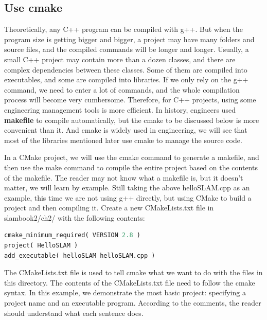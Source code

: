 \subsection{Use cmake}
Theoretically, any C++ program can be compiled with g++. But when the program size is getting bigger and bigger, a project may have many folders and source files, and the compiled commands will be longer and longer. Usually, a small C++ project may contain more than a dozen classes, and there are complex dependencies between these classes. Some of them are compiled into executables, and some are compiled into libraries. If we only rely on the g++ command, we need to enter a lot of commands, and the whole compilation process will become very cumbersome. Therefore, for C++ projects, using some engineering management tools is more efficient. In history, engineers used \textbf{makefile} to compile automatically, but the cmake to be discussed below is more convenient than it. And cmake is widely used in engineering, we will see that most of the libraries mentioned later use cmake to manage the source code.

In a CMake project, we will use the cmake command to generate a makefile, and then use the make command to compile the entire project based on the contents of the makefile. The reader may not know what a makefile is, but it doesn't matter, we will learn by example. Still taking the above helloSLAM.cpp as an example, this time we are not using g++ directly, but using CMake to build a project and then compiling it. Create a new CMakeLists.txt file in slambook2/ch2/ with the following contents:
\begin{lstlisting}[language=Python,caption=slambook2/ch2/CMakeLists.txt]
cmake_minimum_required( VERSION 2.8 )
project( HelloSLAM )
add_executable( helloSLAM helloSLAM.cpp )
\end{lstlisting}

The CMakeLists.txt file is used to tell cmake what we want to do with the files in this directory. The contents of the CMakeLists.txt file need to follow the cmake syntax. In this example, we demonstrate the most basic project: specifying a project name and an executable program. According to the comments, the reader should understand what each sentence does.

